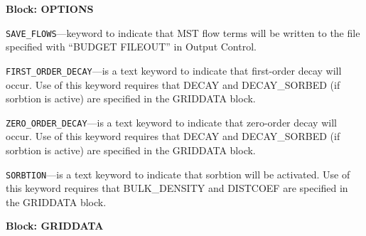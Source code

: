 
\item \textbf{Block: OPTIONS}

\begin{description}
\item \texttt{SAVE\_FLOWS}---keyword to indicate that MST flow terms will be written to the file specified with ``BUDGET FILEOUT'' in Output Control.

\item \texttt{FIRST\_ORDER\_DECAY}---is a text keyword to indicate that first-order decay will occur.  Use of this keyword requires that DECAY and DECAY\_SORBED (if sorbtion is active) are specified in the GRIDDATA block.

\item \texttt{ZERO\_ORDER\_DECAY}---is a text keyword to indicate that zero-order decay will occur.  Use of this keyword requires that DECAY and DECAY\_SORBED (if sorbtion is active) are specified in the GRIDDATA block.

\item \texttt{SORBTION}---is a text keyword to indicate that sorbtion will be activated.  Use of this keyword requires that BULK\_DENSITY and DISTCOEF are specified in the GRIDDATA block.

\end{description}
\item \textbf{Block: GRIDDATA}

